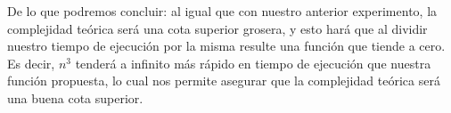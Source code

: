 \documentclass[11pt,a4paper]{article}
\begin{document}
 De lo que podremos concluir: al igual que con nuestro anterior experimento, la complejidad te\'orica ser\'a una cota superior grosera, y esto har\'a que al dividir nuestro tiempo de ejecuci\'on por la misma resulte una funci\'on que tiende a cero. Es decir, $n^{3}$ tender\'a a infinito m\'as r\'apido en tiempo de ejecuci\'on que nuestra funci\'on propuesta, lo cual nos permite asegurar que la complejidad te\'orica ser\'a una buena cota superior.


\pagebreak
\end{document}
